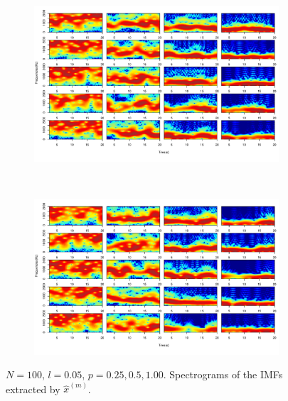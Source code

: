 \documentclass[11pt, a4paper]{article} %
\begin{document}
\begin{figure}
\begin{subfigure}{1.1\textwidth}
  \centering
  \includegraphics[width=\linewidth]{spectro_N100_l005_IMF_m_1_5.pdf}
  \label{fig:sfig1}
\end{subfigure}\\
\begin{subfigure}{1.1\textwidth}
  \centering
  \includegraphics[width=\linewidth]{spectro_N100_l005_IMF_m_6_10.pdf}
  \label{fig:sfig2}
\end{subfigure}
\label{fig1}
\caption{$N = 100$, $l = 0.05$, $p = 0.25, 0.5, 1.00$. Spectrograms of the IMFs extracted by $\hat{x}^{(m)}$.}
\end{figure}

\restoregeometry




\end{document}
